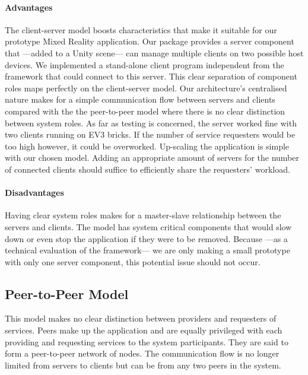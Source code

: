 \paragraph{Advantages}
The client-server model boosts characteristics that make it suitable for our prototype Mixed Reality application. Our package provides a server component that ---added to a Unity scene--- can manage multiple clients on two possible host devices. We implemented a stand-alone client program independent from the framework that could connect to this server. This clear separation of component roles maps perfectly on the client-server model.
Our architecture's centralised nature makes for a simple communication flow between servers and clients compared with the the peer-to-peer model where there is no clear distinction between system roles.
As far as testing is concerned, the server worked fine with two clients running on EV3 bricks. If the number of service requesters would be too high however, it could be overworked. Up-scaling the application is simple with our chosen model.  Adding an appropriate amount of servers for the number of connected clients should suffice to efficiently share the requesters' workload.

\paragraph{Disadvantages}
Having clear system roles makes for a master-slave relationship between the servers and clients. The model has system critical components that would slow down or even stop the application if they were to be removed. Because ---as a technical evaluation of the framework--- we are only making a small prototype with only one server component, this potential issue should not occur. 


\subsection{Peer-to-Peer Model}
This model makes no clear distinction between providers and requesters of services. Peers make up the application and are equally privileged with each providing and requesting services to the system participants. They are said to form a peer-to-peer network of nodes. The communication flow is no longer limited from servers to clients but can be from any two peers in the system.

